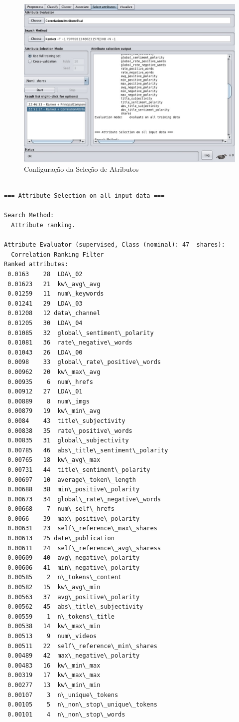 \begin{figure}[H]
    \centering
    \includegraphics[scale=0.4]{tex/img/img2o.jpg}
    \caption{Configuração da Seleção de Atributos}
    \label{fig:SaOn}
\end{figure}
\newpage
\begin{lstlisting}[breaklines,frame=single]

=== Attribute Selection on all input data ===

Search Method:
  Attribute ranking.

Attribute Evaluator (supervised, Class (nominal): 47  shares):
  Correlation Ranking Filter
Ranked attributes:
 0.0163    28  LDA\_02
 0.01623   21  kw\_avg\_avg
 0.01259   11  num\_keywords
 0.01241   29  LDA\_03
 0.01208   12 data\_channel
 0.01205   30  LDA\_04
 0.01085   32  global\_sentiment\_polarity
 0.01081   36  rate\_negative\_words
 0.01043   26  LDA\_00
 0.0098    33  global\_rate\_positive\_words
 0.00962   20  kw\_max\_avg
 0.00935    6  num\_hrefs
 0.00912   27  LDA\_01
 0.00889    8  num\_imgs
 0.00879   19  kw\_min\_avg
 0.0084    43  title\_subjectivity
 0.00838   35  rate\_positive\_words
 0.00835   31  global\_subjectivity
 0.00785   46  abs\_title\_sentiment\_polarity
 0.00765   18  kw\_avg\_max
 0.00731   44  title\_sentiment\_polarity
 0.00697   10  average\_token\_length
 0.00688   38  min\_positive\_polarity
 0.00673   34  global\_rate\_negative\_words
 0.00668    7  num\_self\_hrefs
 0.0066    39  max\_positive\_polarity
 0.00631   23  self\_reference\_max\_shares
 0.00613   25 date\_publication
 0.00611   24  self\_reference\_avg\_sharess
 0.00609   40  avg\_negative\_polarity
 0.00606   41  min\_negative\_polarity
 0.00585    2  n\_tokens\_content
 0.00582   15  kw\_avg\_min
 0.00563   37  avg\_positive\_polarity
 0.00562   45  abs\_title\_subjectivity
 0.00559    1  n\_tokens\_title
 0.00538   14  kw\_max\_min
 0.00513    9  num\_videos
 0.00511   22  self\_reference\_min\_shares
 0.00489   42  max\_negative\_polarity
 0.00483   16  kw\_min\_max
 0.00319   17  kw\_max\_max
 0.00277   13  kw\_min\_min
 0.00107    3  n\_unique\_tokens
 0.00105    5  n\_non\_stop\_unique\_tokens
 0.00101    4  n\_non\_stop\_words

\end{lstlisting}

